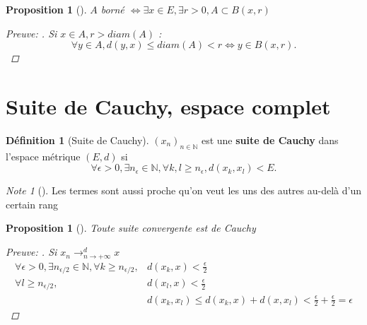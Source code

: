 \documentclass{article}
\theoremstyle{plain}%
\newtheorem{prop}[thm]{Proposition}
\theoremstyle{definition}
\newtheorem{defn}{Définition}[section]
\theoremstyle{remark}
\newtheorem*{note}{Note}
\begin{document}
\begin{prop}[]
    $ A $ borné $ \Leftrightarrow \exists x \in E, \exists r>0, A \subset B(x,r) $ 
    \begin{proof}[Preuve: ]
        Si $ x \in A, r > diam(A) $ : 
        \[
            \forall y \in A, d(y,x) \leq diam(A) < r \Leftrightarrow y \in B(x,r)
        .\]
    \end{proof}
\end{prop}


\section{Suite de Cauchy, espace complet}


\begin{defn}[Suite de Cauchy]
    $ (x_n)_{n \in \mathbb{N}} $ est une \textbf{suite de Cauchy} dans l'espace métrique $ (E,d) $ si 
    \[
        \forall \epsilon > 0, \exists n_\epsilon \in \mathbb{N}, \forall k,l \geq n_\epsilon, d(x_k, x_l) < E
    .\]
    \begin{note}[]
        Les termes sont aussi proche qu'on veut les uns des autres au-delà d'un certain rang
    \end{note}
\end{defn}

\begin{prop}[]
    Toute suite convergente est de Cauchy
    \begin{proof}[Preuve: ]
        Si $ x_n \to _{n \to +\infty }^d x $ 
        \begin{align*}
            \forall \epsilon > 0, \exists n_{\epsilon /2} \in \mathbb{N}, \forall k \geq n_{\epsilon /2}, &d(x_k, x) < \frac{\epsilon }{2} \\
                        \forall l \geq n_{\epsilon /2}, &d(x_l, x) < \frac{\epsilon }{2} \\
                            & d(x_k, x_l) \leq d(x_k, x) + d(x,x_l) < \frac{\epsilon }{2} + \frac{\epsilon }{2} = \epsilon 
        \end{align*}
    \end{proof}
\end{prop}
\end{document}
